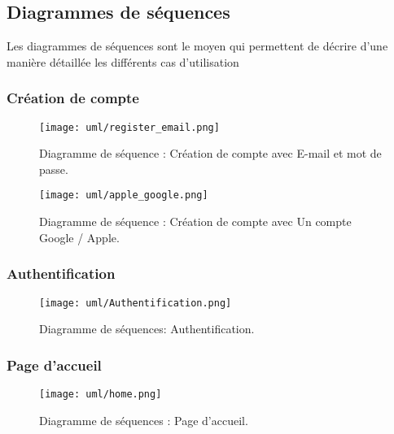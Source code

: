 \subsection{Diagrammes de séquences}
Les diagrammes de séquences sont le moyen qui permettent de décrire d'une manière détaillée les différents cas d'utilisation
\subsubsection{Création de compte}
\begin{figure}[H]
    \centering
    \texttt{[image: uml/register\_email.png]}
    \vspace{1cm}
    \captionsetup{justification=centering}

    \caption{Diagramme de séquence : Création de compte avec E-mail et mot de passe.}
    \label{fig:seq_register_email}
\end{figure}
\begin{figure}[H]
    \centering
    \texttt{[image: uml/apple\_google.png]}
    \vspace{1cm}
    \captionsetup{justification=centering}

    \caption{Diagramme de séquence : Création de compte avec Un compte Google / Apple.}
    \label{fig:seq_register_apple_google}
\end{figure}
\subsubsection{Authentification}
\begin{center}
    \begin{figure}[H]
        \centering
        \texttt{[image: uml/Authentification.png]}
        \vspace{1cm}
        \captionsetup{justification=centering}

        \caption{Diagramme de séquences: Authentification.}
        \label{fig:seq_auth}
    \end{figure}
\end{center}
\subsubsection{Page d'accueil}
\begin{figure}[H]
    \centering
    \texttt{[image: uml/home.png]}
    \vspace{1cm}
    \caption{Diagramme de séquences : Page d'accueil.}
    \label{fig:seq_home}
\end{figure}

